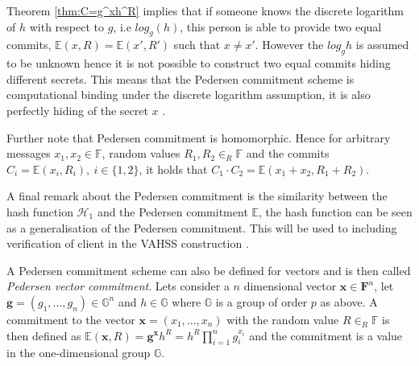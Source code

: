 Theorem \ref{thm:C=g^xh^R} implies that if someone knows the discrete logarithm of $h$ with respect to $g$, i.e $log_g(h)$, this person is able to provide two equal commits, $\mathds{E}(x,R)=\mathds{E}(x',R')$ such that $x\neq x'$. However the $log_g h$ is assumed to be unknown hence it is not possible to construct two equal commits hiding different secrets. This means that the Pedersen commitment scheme is computational binding under the discrete logarithm assumption, it is also perfectly hiding of the secret $x$ \cite{pedersen}. 

Further note that Pedersen commitment is homomorphic. Hence for arbitrary messages $x_1,x_2\in\mathds{F}$, random values $R_1,R_2\in_R\mathds{F}$ and the commits $C_i=\mathds{E}(x_i,R_i),\:i\in\{1,2\}$, it holds that $C_1\cdot C_2 = \mathds{E}(x_1+x_2,R_1+R_2)$.

A final remark about the Pedersen commitment is the similarity between the hash function $\mathcal{H}_1$ and the Pedersen commitment $\mathds{E}$, the hash function can be seen as a generalisation of the Pedersen commitment. This will be used to including verification of client in the VAHSS construction \cite{SumItUp}.

A Pedersen commitment scheme can also be defined for vectors and is then called \textit{Pedersen vector commitment}. Lets consider a $n$ dimensional vector $\mathbf{x}\in\mathbf{F}^n$, let $\mathbf{g}=(g_1,...,g_n) \in\mathds{G}^n$ and $h\in\mathds{G}$ where $\mathds{G}$ is a group of order $p$ as above. A commitment to the vector  $\mathbf{x}=(x_1,...,x_n)$  with the random value $R\in_R \mathds{F}$ is then defined as $\mathds{E}(\mathbf{x},R) = \mathbf{g}^\mathbf{x}h^R = h^R\prod_{i=1}^n g_i^{x_i}$ and the commitment is a value in the one-dimensional group $\mathds{G}$. 

